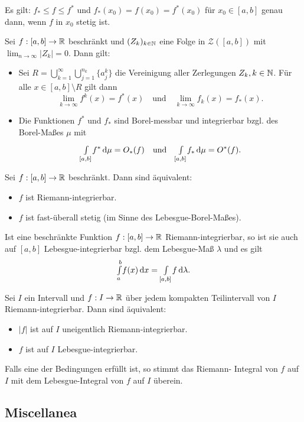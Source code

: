 \documentclass{cheat-sheet}
\begin{document}
\begin{bem}
  Es gilt: $f_* \leq f \leq f^*$ und $f_*(x_0) = f(x_0) = f^*(x_0)$ für $x_0 \in [a, b]$ genau dann, wenn $f$ in $x_0$ stetig ist.
\end{bem}

\begin{satz}
  Sei $f : [a, b] \to \mathbb{R}$ beschränkt und $(Z_k)_{k \in \mathbb{N}}$ eine Folge in $\mathcal{Z}([a, b])$ mit $\lim_{n \to \infty} \left|Z_k\right| = 0$. Dann gilt:
  \begin{itemize}
    \item Sei $R = \bigcup_{k=1}^\infty \bigcup_{j=1}^{n_k} \{ a_j^k \}$ die Vereinigung aller Zerlegungen $Z_k, k \in \mathbb{N}$. Für alle $x \in [a, b] \setminus R$ gilt dann
    \[
      \lim_{k \to \infty} f^k(x) = f^*(x)
      \quad \text{und} \quad
      \lim_{k \to \infty} f_k(x) = f_*(x).
    \]
    \item Die Funktionen $f^*$ und $f_*$ sind Borel-messbar und integrierbar bzgl. des Borel-Maßes $\mu$ mit
    \[ {\textstyle \int\limits_{[a, b]}^{}} f^* \,\mathrm{d} \mu = O_*(f) \quad \text{und} \quad {\textstyle \int\limits_{[a, b]}^{}} f_* \,\mathrm{d} \mu = O^*(f). \]
  \end{itemize}
\end{satz}

\begin{satz}
  Sei $f : [a, b] \to \mathbb{R}$ beschränkt. Dann sind äquivalent:
  \begin{itemize}
    \item $f$ ist Riemann-integrierbar.
    \item $f$ ist fast-überall stetig (im Sinne des Lebesgue-Borel-Maßes).
  \end{itemize}
\end{satz}

\begin{satz}
  Ist eine beschränkte Funktion $f : [a, b] \to \mathbb{R}$ Riemann-integrierbar, so ist sie auch auf $[a, b]$ Lebesgue-integrierbar bzgl. dem Lebesgue-Maß $\lambda$ und es gilt
  \[ {\textstyle \int\limits_{a}^{b}} f(x) \,\mathrm{d} x = {\textstyle \int\limits_{[a, b]}^{}} f \,\mathrm{d} \lambda. \]
\end{satz}

\begin{samepage}
\begin{satz}
  Sei $I$ ein Intervall und $f : I \to \mathbb{R}$ über jedem kompakten Teilintervall von $I$ Riemann-integrierbar. Dann sind äquivalent:
  \begin{itemize}
    \item $\left|f\right|$ ist auf $I$ uneigentlich Riemann-integrierbar.
    \item $f$ ist auf $I$ Lebesgue-integrierbar.
  \end{itemize}
  Falls eine der Bedingungen erfüllt ist, so stimmt das Riemann- Integral von $f$ auf $I$ mit dem Lebesgue-Integral von $f$ auf $I$ überein.
\end{satz}


\subsection{Miscellanea}
\end{samepage}
\end{document}
